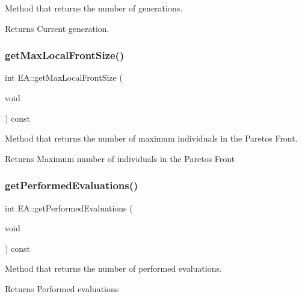 Method that returns the number of generations. 

\begin{DoxyReturn}{Returns}
Current generation. 
\end{DoxyReturn}
\mbox{\label{classEA_ae84da938d98677fa658c2b3659a7c356}} 
\subsubsection{\texorpdfstring{get\+Max\+Local\+Front\+Size()}{getMaxLocalFrontSize()}}
{\footnotesize\ttfamily int E\+A\+::get\+Max\+Local\+Front\+Size (\begin{DoxyParamCaption}\item[{void}]{ }\end{DoxyParamCaption}) const\hspace{0.3cm}{\ttfamily [inline]}}



Method that returns the number of maximum individuals in the Pareto\textquotesingle{}s Front. 

\begin{DoxyReturn}{Returns}
Maximum number of individuals in the Pareto\textquotesingle{}s Front 
\end{DoxyReturn}
\mbox{\label{classEA_ab40a86dcc65d506f7327e457e137859f}} 
\subsubsection{\texorpdfstring{get\+Performed\+Evaluations()}{getPerformedEvaluations()}}
{\footnotesize\ttfamily int E\+A\+::get\+Performed\+Evaluations (\begin{DoxyParamCaption}\item[{void}]{ }\end{DoxyParamCaption}) const\hspace{0.3cm}{\ttfamily [inline]}}



Method that returns the number of performed evaluations. 

\begin{DoxyReturn}{Returns}
Performed evaluations 
\end{DoxyReturn}
\mbox{\label{classEA_a107a7507708a8a4db8ca2dfbef72f52c}} 
